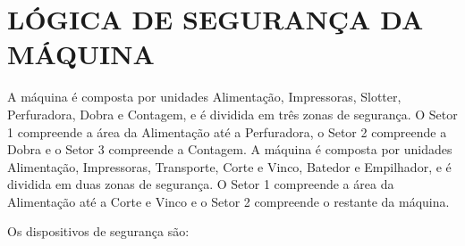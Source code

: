 \newpage
\thispagestyle{fancy}
\vspace*{40 pt}
  
\section{\large\MakeUppercase{{Lógica de segurança da máquina}}}

\ifmachineType
 A máquina é composta por unidades Alimentação, Impressoras, Slotter, Perfuradora, Dobra e Contagem, e é dividida em três zonas de segurança.
 O Setor 1 compreende a área da Alimentação até a Perfuradora, o Setor 2 compreende a Dobra e o Setor 3 compreende a Contagem.
\else
A máquina é composta por unidades Alimentação, Impressoras, Transporte, Corte e Vinco, Batedor e Empilhador, e é dividida em duas zonas de segurança.
 O Setor 1 compreende a área da Alimentação até a Corte e Vinco e o Setor 2 compreende o restante da máquina.
\fi

Os dispositivos de segurança são:
\vspace*{10pt}



